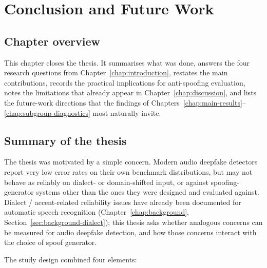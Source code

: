 \cleardoubleoddpage
\chapter{Conclusion and Future Work}
\label{chap:conclusion}



\section{Chapter overview}
\label{sec:conclusion-overview}

This chapter closes the thesis. It summarises what was done, answers
the four research questions from Chapter~\ref{chap:introduction}, restates the main
contributions, records the practical implications for
anti-spoofing evaluation, notes the limitations that already
appear in Chapter~\ref{chap:discussion}, and lists the future-work directions that the
findings of Chapters~\ref{chap:main-results}--\ref{chap:subgroup-diagnostics} most naturally invite.


\section{Summary of the thesis}
\label{sec:conclusion-summary}

The thesis was motivated by a simple concern. Modern audio
deepfake detectors report very low error rates on their own
benchmark distributions, but may not behave as reliably on
dialect- or domain-shifted input, or against spoofing-generator
systems other than the ones they were designed and evaluated
against. Dialect / accent-related reliability issues
have already been documented for automatic speech recognition
(Chapter~\ref{chap:background}, Section~\ref{sec:background-dialect}); this thesis asks whether analogous
concerns can be measured for audio deepfake detection, and how
those concerns interact with the choice of spoof generator.

The study design combined four elements:

